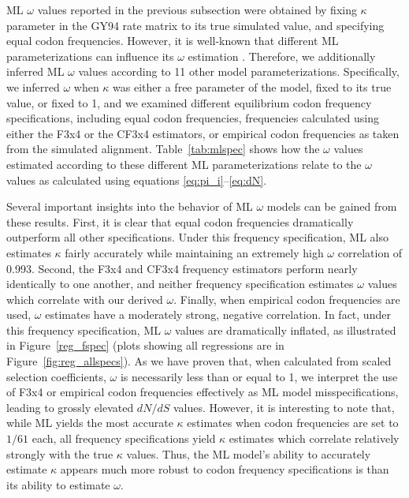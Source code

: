 \documentclass[11pt]{article}
\begin{document}
ML $\omega$ values reported in the previous subsection were obtained by fixing $\kappa$ parameter in the GY94 rate matrix to its true simulated value, and specifying equal codon frequencies. However, it is well-known that different ML parameterizations can influence its $\omega$ estimation \cite{YN00,Yang2006,ZhangYu2006}.  Therefore, we additionally inferred ML $\omega$ values according to 11 other model parameterizations. Specifically, we inferred $\omega$ when $\kappa$ was either a free parameter of the model, fixed to its true value, or fixed to 1, and we examined different equilibrium codon frequency specifications, including equal codon frequencies, frequencies calculated using either the F3x4 \cite{MuseGaut1994} or the CF3x4 \cite{Pond2010} estimators, or empirical codon frequencies as taken from the simulated alignment. Table~\ref{tab:mlspec} shows how the $\omega$ values estimated according to these different ML parameterizations relate to the $\omega$ values as calculated using equations \eqref{eq:pi_i}--\eqref{eq:dN}. 

Several important insights into the behavior of ML $\omega$ models can be gained from these results. First, it is clear that equal codon frequencies dramatically outperform all other specifications. Under this frequency specification, ML also estimates $\kappa$ fairly accurately while maintaining an extremely high $\omega$ correlation of 0.993. Second, the F3x4 and CF3x4 frequency estimators perform nearly identically to one another, and neither frequency specification estimates $\omega$ values which correlate with our derived $\omega$. Finally, when empirical codon frequencies are used, $\omega$ estimates have a moderately strong, negative correlation. In fact, under this frequency specification, ML $\omega$ values are dramatically inflated, as illustrated in Figure~\ref{reg_fspec} (plots showing all regressions are in Figure~\ref{fig:reg_allspecs}). As we have proven that, when calculated from scaled selection coefficients, $\omega$ is necessarily less than or equal to 1, we interpret the use of F3x4 or empirical codon frequencies effectively as ML model misspecifications, leading to grossly elevated $dN/dS$ values. However, it is interesting to note that, while ML yields the most accurate $\kappa$ estimates when codon frequencies are set to $1/61$ each, all frequency specifications yield $\kappa$ estimates which correlate relatively strongly with the true $\kappa$ values. Thus, the ML model's ability to accurately estimate $\kappa$ appears much more robust to codon frequency specifications is than its ability to estimate $\omega$.
\end{document}

